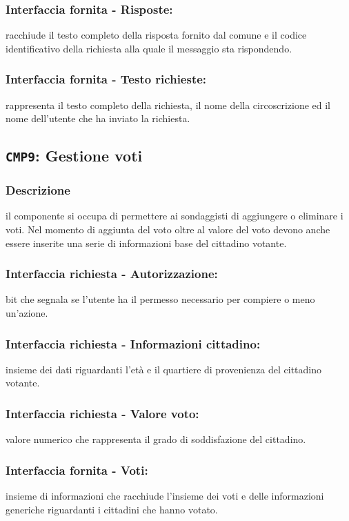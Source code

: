         \subsubsection{Interfaccia fornita - Risposte:}
            racchiude il testo completo della risposta fornito dal comune e il codice identificativo della richiesta alla quale il messaggio sta rispondendo.
        \subsubsection{Interfaccia fornita - Testo richieste:}
            rappresenta il testo completo della richiesta, il nome della circoscrizione ed il nome dell'utente che ha inviato la richiesta.

    \subsection{\texttt{CMP9}: Gestione voti}
        \subsubsection{Descrizione}
            il componente si occupa di permettere ai sondaggisti di aggiungere o eliminare i voti. Nel momento di aggiunta del voto oltre al valore del voto devono anche essere inserite una serie di informazioni base del cittadino votante.
        \subsubsection{Interfaccia richiesta - Autorizzazione:}
            bit che segnala se l'utente ha il permesso necessario per compiere o meno un'azione.
        \subsubsection{Interfaccia richiesta - Informazioni cittadino:}
            insieme dei dati riguardanti l'età e il quartiere di provenienza del cittadino votante.
        \subsubsection{Interfaccia richiesta - Valore voto:}
            valore numerico che rappresenta il grado di soddisfazione del cittadino.
        \subsubsection{Interfaccia fornita - Voti:}
            insieme di informazioni che racchiude l'insieme dei voti e delle informazioni generiche riguardanti i cittadini che hanno votato.

